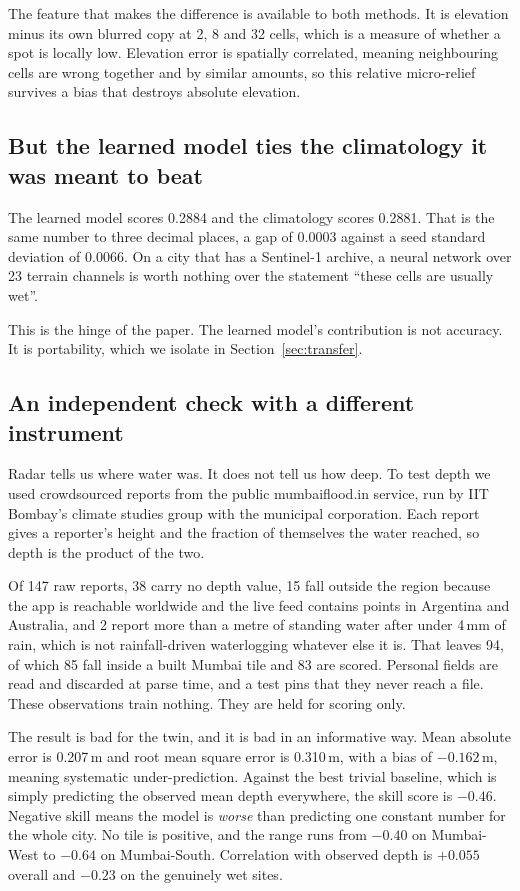 The feature that makes the difference is available to both methods. It is elevation minus its own
blurred copy at 2, 8 and 32 cells, which is a measure of whether a spot is locally low. Elevation
error is spatially correlated, meaning neighbouring cells are wrong together and by similar
amounts, so this relative micro-relief survives a bias that destroys absolute elevation.

\subsection{But the learned model ties the climatology it was meant to beat}
The learned model scores 0.2884 and the climatology scores 0.2881. That is the same number to three
decimal places, a gap of 0.0003 against a seed standard deviation of 0.0066. On a city that has a
Sentinel-1 archive, a neural network over 23 terrain channels is worth nothing over the statement
``these cells are usually wet''.

This is the hinge of the paper. The learned model's contribution is not accuracy. It is
portability, which we isolate in Section~\ref{sec:transfer}.

\subsection{An independent check with a different instrument}
Radar tells us where water was. It does not tell us how deep. To test depth we used crowdsourced
reports from the public mumbaiflood.in service, run by IIT Bombay's climate studies group with the
municipal corporation. Each report gives a reporter's height and the fraction of themselves the
water reached, so depth is the product of the two.

Of 147 raw reports, 38 carry no depth value, 15 fall outside the region because the app is
reachable worldwide and the live feed contains points in Argentina and Australia, and 2 report
more than a metre of standing water after under 4\,mm of rain, which is not rainfall-driven
waterlogging whatever else it is. That leaves 94, of which 85 fall inside a built Mumbai tile and
83 are scored. Personal fields are read and discarded at parse time, and a test pins that they
never reach a file. These observations train nothing. They are held for scoring only.

The result is bad for the twin, and it is bad in an informative way. Mean absolute error is
0.207\,m and root mean square error is 0.310\,m, with a bias of $-0.162$\,m, meaning systematic
under-prediction. Against the best trivial baseline, which is simply predicting the observed mean
depth everywhere, the skill score is $-0.46$. Negative skill means the model is \emph{worse} than
predicting one constant number for the whole city. No tile is positive, and the range runs from
$-0.40$ on Mumbai-West to $-0.64$ on Mumbai-South. Correlation with observed depth is $+0.055$
overall and $-0.23$ on the genuinely wet sites.

